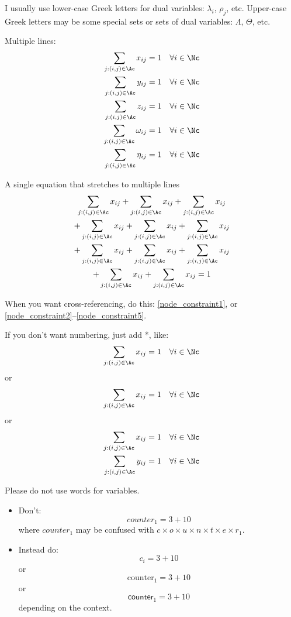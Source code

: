 \documentclass[letterpaper, 11pt]{article}
\begin{document}
I usually use lower-case Greek letters for dual variables: $\lambda_i$, $\rho_j$, etc. Upper-case Greek letters may be some special sets or sets of dual variables: $\Lambda$, $\Theta$, etc.

Multiple lines:
\begin{align}
	\sum_{j:(i,j)\in\Ac} x_{ij} = 1 \quad & \forall i\in\Nc \label{node_constraint2} \\
	\sum_{j:(i,j)\in\Ac} y_{ij} = 1 \quad & \forall i\in\Nc \nonumber \\
	\sum_{j:(i,j)\in\Ac} z_{ij} = 1 \quad & \forall i\in\Nc \label{node_constraint3} \\
	\sum_{j:(i,j)\in\Ac} \omega_{ij} = 1 \quad & \forall i\in\Nc \label{node_constraint4} \\
	\sum_{j:(i,j)\in\Ac} \eta_{ij} = 1 \quad & \forall i\in\Nc \label{node_constraint5} 
\end{align}

A single equation that stretches to multiple lines
\begin{multline}
	\sum_{j:(i,j)\in\Ac} x_{ij} + \sum_{j:(i,j)\in\Ac} x_{ij} + \sum_{j:(i,j)\in\Ac} x_{ij} \\
	+ \sum_{j:(i,j)\in\Ac} x_{ij} +	\sum_{j:(i,j)\in\Ac} x_{ij} + \sum_{j:(i,j)\in\Ac} x_{ij} \\
	+ \sum_{j:(i,j)\in\Ac} x_{ij} +	\sum_{j:(i,j)\in\Ac} x_{ij} + \sum_{j:(i,j)\in\Ac} x_{ij} \\
	+ \sum_{j:(i,j)\in\Ac} x_{ij} + \sum_{j:(i,j)\in\Ac} x_{ij} = 1 
\end{multline}

When you want cross-referencing, do this: \eqref{node_constraint1}, or \eqref{node_constraint2}--\eqref{node_constraint5}.

If you don't want numbering, just add *, like:
\begin{equation*}
	\sum_{j:(i,j)\in\Ac} x_{ij} = 1 \quad \forall i\in\Nc
\end{equation*}
or
\[
	\sum_{j:(i,j)\in\Ac} x_{ij} = 1 \quad \forall i\in\Nc
\]
or
\begin{align*}
	\sum_{j:(i,j)\in\Ac} x_{ij} = 1 \quad & \forall i\in\Nc \\
	\sum_{j:(i,j)\in\Ac} y_{ij} = 1 \quad & \forall i\in\Nc \\
\end{align*}

Please do not use words for variables. 
\begin{itemize}
\item Don't:
	\[
		counter_1 = 3 + 10 
	\]
	where $counter_1$ may be confused with $c \times o \times u \times n \times t \times e \times r_1$.

\item Instead do:
	\[
		c_i = 3 + 10
	\]
	or
	\[
		\text{counter}_1 = 3 + 10
	\]
	or
	\[
		\textsf{counter}_1 = 3 + 10
	\]
depending on the context.
\end{itemize}
\end{document}
